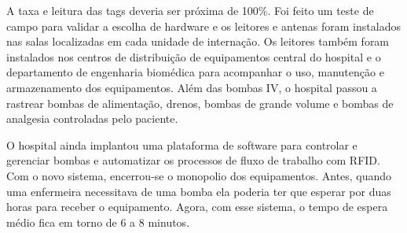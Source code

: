 A taxa e leitura das tags deveria ser próxima de 100\%. Foi feito um teste de campo para validar a escolha de hardware e os leitores e antenas foram instalados nas salas localizadas em cada unidade de internação. Os leitores também foram instalados nos centros de distribuição de equipamentos central do hospital e o departamento de engenharia biomédica para acompanhar o uso, manutenção e armazenamento dos equipamentos. Além das bombas IV, o hospital passou a rastrear bombas de alimentação, drenos, bombas de grande volume e bombas de analgesia controladas pelo paciente.

O hospital ainda implantou uma plataforma de software para controlar e gerenciar bombas e automatizar os processos de fluxo de trabalho com RFID. Com o novo sistema, encerrou-se o monopolio dos equipamentos. Antes, quando uma enfermeira necessitava de uma bomba ela poderia ter que esperar por duas horas para receber o equipamento. Agora, com esse sistema, o tempo de espera médio fica em torno de 6 a 8 minutos.

